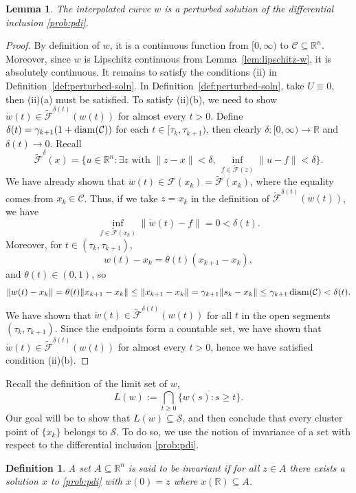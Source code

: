 \documentclass[pdflatex,sn-mathphys-num]{sn-jnl}%
\newcommand\diam{\mathop{\rm diam}}
\newcommand\R{\mathbb{R}}
\newcommand\C{\mathcal{C}}
\newcommand\mF{\mathcal{F}}
\newcommand\tmF{\widetilde{\mF}}
\newcommand\dw{\dot{w}}
\newcommand\mS{\mathcal{S}}
\theoremstyle{thmstyleone}%
\newtheorem{lemma}[theorem]{Lemma}%
\theoremstyle{thmstyletwo}%
\theoremstyle{thmstylethree}%
\newtheorem{definition}{Definition}%
\begin{document}
\begin{lemma} \label{lem:perturbed}
  The interpolated curve $w$ is a perturbed solution of the differential inclusion \eqref{prob:pdi}.
\end{lemma}
\begin{proof}
  By definition of $w$, it is a continuous function from $[0,\infty)$ to $\C \subseteq \R^n$. Moreover, since $w$ is Lipschitz continuous
  from Lemma~\ref{lem:lipschitz-w}, it is absolutely continuous. It remains to satisfy the conditions (ii) in Definition~\ref{def:perturbed-soln}.
  In Definition~\ref{def:perturbed-soln}, take $U \equiv 0$, then (ii)(a) must be satisfied. To satisfy (ii)(b), we need to show $\dw(t) \in \tmF^{\delta(t)}(w(t))$
  for almost every $t > 0$. Define $\delta(t) = \gamma_{k+1}(1 + \diam(\C))$ for each $t \in [\tau_k,\tau_{k+1})$, then clearly $\delta : [0,\infty) \to \R$ and $\delta(t) \to 0$.
  Recall
  \[
    \tmF^{\delta}(x) = \{u \in \R^n : \exists z \text{ with } \lVert z - x\rVert < \delta,\, \inf_{f \in \tmF(z)}\lVert u - f\rVert < \delta\}.
  \]
  We have already shown that $\dw(t) \in \mF(x_k) = \tmF(x_k)$, where the equality comes from $x_k \in \C$. Thus, if we take $z = x_k$ in the definition of $\tmF^{\delta(t)}(w(t))$, we have
  \[
    \inf_{f \in \tmF(x_k)} \lVert \dw(t) - f\rVert = 0 < \delta(t).
  \]
  Moreover, for $t \in (\tau_k,\tau_{k+1})$,
  \[
    w(t) - x_k = \theta(t)(x_{k+1} - x_k),
  \]
  and $\theta(t) \in (0,1)$, so
  \[
    \lVert w(t) - x_k\rVert = \theta(t)\lVert x_{k+1} - x_k\rVert \leq \lVert x_{k+1} - x_k\rVert = \gamma_{k+1}\lVert s_k - x_k\rVert \leq \gamma_{k+1}\diam(\C) < \delta(t).
  \]
  We have shown that $\dw(t) \in \tmF^{\delta(t)}(w(t))$ for all $t$ in the open segments $(\tau_k,\tau_{k+1})$. Since the endpoints form a countable set,
  we have shown that $\dw(t) \in \tmF^{\delta(t)}(w(t))$ for almost every $t > 0$, hence we have satisfied condition (ii)(b).
\end{proof}

Recall the definition of the limit set of $w$,
\[
  L(w) := \bigcap_{t \geq 0} \overline{\{w(s) : s \geq t\}}.
\]
Our goal will be to show that $L(w) \subseteq \mS$, and then conclude that every cluster point of $\{x_k\}$ belongs to $\mS$.
To do so, we use the notion of invariance of a set with respect to the differential inclusion \eqref{prob:pdi}.

\begin{definition}
  A set $A \subseteq \R^n$ is said to be invariant if for all $z \in A$ there exists a solution $x$ to \eqref{prob:pdi} with
  $x(0) = z$ where $x(\R) \subseteq A$.
\end{definition}
\end{document}
